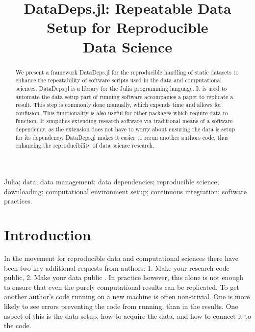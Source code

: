 \documentclass[twoside,11pt]{article}\usepackage{jmlr2e}
\begin{document}
\title{DataDeps.jl: Repeatable Data Setup for Reproducible\\ Data Science}
\author{
}
\editor{}


\maketitle

\begin{abstract}
	We present a framework DataDeps.jl for the reproducible handling of static datasets to enhance the repeatability of software scripts used in the data and computational sciences.
	DataDeps.jl is a library for the Julia programming language.
	It is used to automate the data setup part of running software accompanies a paper to replicate a result.
	This step is commonly done manually, which expends time and allows for confusion.
	This functionality is also useful for other packages which require data to function.
	It simplifies extending research software via traditional means of a software dependency, as the extension does not have to worry about ensuring the data is setup for its dependency.
	DataDeps.jl makes it easier to rerun another authors code, thus enhancing the reproducibility of data science research.
\end{abstract}

\begin{keywords}
Julia; data; data management;  data dependencies; reproducible science; downloading; computational environment setup; continuous integration; software practices.
\end{keywords}

\section{Introduction}

In the movement for reproducible data and computational sciences there have been two key additional requests from authors:
1. Make your research code public, 2. Make your data public \citep{lookafterdata}.
In practice however, this alone is not enough to ensure that even the purely computational results can be replicated.
To get another author's code running on a new machine is often non-trivial.
One is more likely to see errors preventing the code from running, than in the results.
One aspect of this is the data setup, how to acquire the data, and how to connect it to the code.
\end{document}
